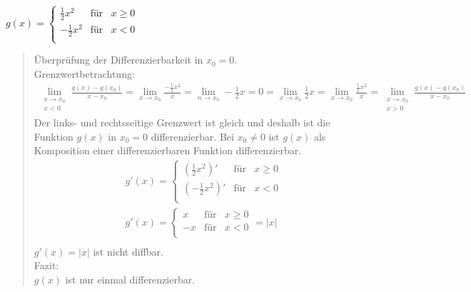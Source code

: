 \textbullet \;\;$ g(x) =     \left\{ \begin{array}{rcl}
\frac{1}{2 }x^2 & \mbox{für} & x\geq0\\
-\frac{1}{2}x^2 & \mbox{für} & x< 0 \\

\end{array}\right.$ \\
\begin{quote}
Überprüfung der Differenzierbarkeit in $ x_0=0 $.\\
Grenzwertbetrachtung:\\
\begin{align*}
\lim\limits_ {\substack{x \to x_0 \\ x<0}}\frac{g(x)-g(x_0)}{x-x_0}=\lim\limits_ {x\to x_0}\frac{-\frac{1}{2}x^2}{x}=\lim\limits_ {n\to x_0}-\frac{1}{2}x=0=\lim\limits_ {x\to x_0}\frac{1}{2}x=\lim\limits_ {x\to x_0}\frac{\frac{1}{2}x^2}{x}=\lim\limits_ {\substack{x \to x_0 \\ x> 0}}\frac{g(x)-g(x_0)}{x-x_0}
\end{align*}
Der links- und rechtsseitige Grenzwert ist gleich und deshalb ist die Funktion
$ g(x) $ in $ x_0=0 $ differenzierbar. Bei $ x_0\neq 0 $ ist $ g(x) $ als Komposition einer differenzierbaren Funktion differenzierbar.\\

\begin{align*}
&g'(x) =     \left\{ \begin{array}{rcl}
(\frac{1}{2}x^2)' & \mbox{für} & x\geq 0\\
(-\frac{1}{2}x^2)' & \mbox{für} & x<0 \\
\end{array}\right.\\
&g'(x) =     \left\{ \begin{array}{rcl}
x & \mbox{für} & x\geq 0\\
-x & \mbox{für} & x<0 \\
\end{array}\right.=|x|\\
\end{align*}
$ g'(x)=|x| $ ist nicht diffbar.\\
Fazit:\\
$ g(x) $ ist nur einmal differenzierbar.\\
\end{quote}
